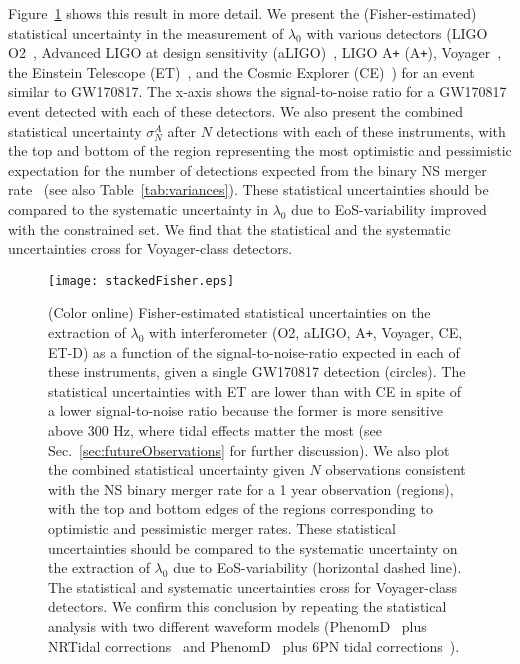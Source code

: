 \documentclass[prd,twocolumn,nofootinbib,superscriptaddress,amsmath,amssymb]{revtex4-1}
\begin{document}
Figure~\ref{fig:stackedFisher} shows this result in more detail. We present the (Fisher-estimated) statistical uncertainty in the measurement of $\lambda_{0}$ with various detectors (LIGO O2~\cite{aLIGO}, Advanced LIGO at design sensitivity (aLIGO)~\cite{aLIGO}, LIGO A\texttt{+} (A\texttt{+})\cite{Ap_Voyager_CE}, Voyager~\cite{Ap_Voyager_CE}, the Einstein Telescope (ET)~\cite{ET}, and the Cosmic Explorer (CE)~\cite{Ap_Voyager_CE}) for an event similar to GW170817. The x-axis shows the signal-to-noise ratio for a GW170817 event detected with each of these detectors. We also present the combined statistical uncertainty $\sigma^A_N$ after $N$ detections with each of these instruments, with the top and bottom of the region representing the most optimistic and pessimistic expectation for the number of detections expected from the binary NS merger rate~\cite{Abbott2017} (see also Table~\ref{tab:variances}). These statistical uncertainties should be compared to the systematic uncertainty in $\lambda_{0}$ due to EoS-variability improved with the constrained set. We find that the statistical and the systematic uncertainties cross for Voyager-class detectors.

\begin{figure}
\begin{center} 
\texttt{[image: stackedFisher.eps]}
\end{center}
\caption{(Color online) Fisher-estimated statistical uncertainties on the extraction of $\lambda_{0}$ with interferometer (O2, aLIGO, A\texttt{+}, Voyager, CE, ET-D) as a function of the signal-to-noise-ratio expected in each of these instruments, given a single GW170817 detection (circles). The statistical uncertainties with ET are lower than with CE in spite of a lower signal-to-noise ratio because the former is more sensitive above 300 Hz, where tidal effects matter the most (see Sec.~\ref{sec:futureObservations} for further discussion). We also plot the combined statistical uncertainty given $N$ observations consistent with the NS binary merger rate for a 1 year observation (regions), with the top and bottom edges of the regions corresponding to optimistic and pessimistic  merger rates. These statistical uncertainties should be compared to the systematic uncertainty on the extraction of $\lambda_{0}$ due to EoS-variability (horizontal dashed line). The statistical and systematic uncertainties cross for Voyager-class detectors. We confirm this conclusion by repeating the statistical analysis with two different waveform models (PhenomD~\cite{PhenomDI,PhenomDII} plus NRTidal corrections~\cite{Dietrich:2017aum,Samajdar:NRTidal} and PhenomD~\cite{PhenomDI,PhenomDII} plus 6PN tidal corrections~\cite{Vines:2011ud,Wade:tidalCorrections}).}
\label{fig:stackedFisher}
\end{figure} 
\end{document}
